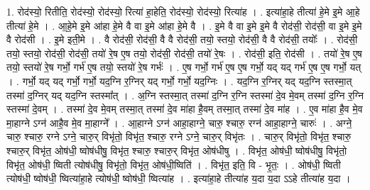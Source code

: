 \documentclass[17pt]{extarticle}
\begin{document}
1. रोद॑स्यो॒ रितीति॒ रोद॑स्यो॒ रोद॑स्यो॒ रित्या॑ हा॒हेति॒ रोद॑स्यो॒ रोद॑स्यो॒ रित्या॑ह । . इत्या॑हा॒हे तीत्या॑ हे॒मे इ॒मे आ॒हे तीत्या॑ हे॒मे । . आ॒हे॒मे इ॒मे आ॑हा हे॒मे वै वा इ॒मे आ॑हा हे॒मे वै । . इ॒मे वै वा इ॒मे इ॒मे वै रोद॑सी॒ रोद॑सी॒ वा इ॒मे इ॒मे वै रोद॑सी । . इ॒मे इती॒मे । . वै रोद॑सी॒ रोद॑सी॒ वै वै रोद॑सी॒ तयो॒ स्तयो॒ रोद॑सी॒ वै वै रोद॑सी॒ तयोः᳚ । . रोद॑सी॒ तयो॒ स्तयो॒ रोद॑सी॒ रोद॑सी॒ तयो॑ रे॒ष ए॒ष तयो॒ रोद॑सी॒ रोद॑सी॒ तयो॑ रे॒षः । . रोद॑सी॒ इति॒ रोद॑सी । . तयो॑ रे॒ष ए॒ष तयो॒ स्तयो॑ रे॒ष गर्भो॒ गर्भ॑ ए॒ष तयो॒ स्तयो॑ रे॒ष गर्भः॑ । . ए॒ष गर्भो॒ गर्भ॑ ए॒ष ए॒ष गर्भो॒ यद् यद् गर्भ॑ ए॒ष ए॒ष गर्भो॒ यत् । . गर्भो॒ यद् यद् गर्भो॒ गर्भो॒ यद॒ग्नि र॒ग्निर् यद् गर्भो॒ गर्भो॒ यद॒ग्निः । . यद॒ग्नि र॒ग्निर् यद् यद॒ग्नि स्तस्मा॒त् तस्मा॑ द॒ग्निर् यद् यद॒ग्नि स्तस्मा᳚त् । . अ॒ग्नि स्तस्मा॒त् तस्मा॑ द॒ग्नि र॒ग्नि स्तस्मा॑ दे॒व मे॒वम् तस्मा॑ द॒ग्नि र॒ग्नि स्तस्मा॑ दे॒वम् । . तस्मा॑ दे॒व मे॒वम् तस्मा॒त् तस्मा॑ दे॒व मा॑हा है॒वम् तस्मा॒त् तस्मा॑ दे॒व मा॑ह । . ए॒व मा॑हा है॒व मे॒व मा॒हाग्ने ऽग्न॑ आहै॒व मे॒व मा॒हाग्ने᳚ । . आ॒हाग्ने ऽग्न॑ आहा॒हाग्ने॒ चारु॒ श्चारु॒ रग्न॑ आहा॒हाग्ने॒ चारुः॑ । . अग्ने॒ चारु॒ श्चारु॒ रग्ने ऽग्ने॒ चारु॒र् विभृ॑तो॒ विभृ॑त॒ श्चारु॒ रग्ने ऽग्ने॒ चारु॒र् विभृ॑तः । . चारु॒र् विभृ॑तो॒ विभृ॑त॒ श्चारु॒ श्चारु॒र् विभृ॑त॒ ओष॑धी॒ ष्वोष॑धीषु॒ विभृ॑त॒ श्चारु॒ श्चारु॒र् विभृ॑त॒ ओष॑धीषु । . विभृ॑त॒ ओष॑धी॒ ष्वोष॑धीषु॒ विभृ॑तो॒ विभृ॑त॒ ओष॑धी॒ ष्विती त्योष॑धीषु॒ विभृ॑तो॒ विभृ॑त॒ ओष॑धी॒ष्विति॑ । . विभृ॑त॒ इति॒ वि - भृ॒तः॒ । . ओष॑धी॒ ष्विती त्योष॑धी॒ ष्वोष॑धी॒ ष्वित्या॑हा॒हे त्योष॑धी॒ ष्वोष॑धी॒ ष्वित्या॑ह । . इत्या॑हा॒हे तीत्या॑ह य॒दा य॒दा ऽऽहे तीत्या॑ह य॒दा । \newline
\end{document}
